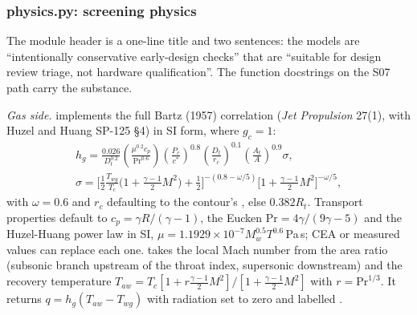 \subsubsection*{physics.py: screening physics}

The module header is a one-line title and two sentences: the models are ``intentionally conservative early-design checks'' that are ``suitable for design review triage, not hardware qualification''. The function docstrings on the S07 path carry the substance.

\emph{Gas side.}  implements the full Bartz (1957) correlation (\emph{Jet Propulsion} 27(1), with Huzel and Huang SP-125 \S4) in SI form, where $g_c = 1$:
\begin{gather*}
h_g = \frac{0.026}{D_t^{0.2}}\left(\frac{\mu^{0.2}c_p}{\mathrm{Pr}^{0.6}}\right)\left(\frac{P_c}{c^*}\right)^{0.8}\left(\frac{D_t}{r_c}\right)^{0.1}\left(\frac{A_t}{A}\right)^{0.9}\sigma,\\
\sigma = \Big[\tfrac12\tfrac{T_{wg}}{T_c}\big(1+\tfrac{\gamma-1}{2}M^2\big)+\tfrac12\Big]^{-(0.8-\omega/5)}\Big[1+\tfrac{\gamma-1}{2}M^2\Big]^{-\omega/5},
\end{gather*}
with $\omega = 0.6$ and $r_c$ defaulting to the contour's , else $0.382R_t$. Transport properties default to $c_p = \gamma R/(\gamma-1)$, the Eucken $\mathrm{Pr} = 4\gamma/(9\gamma-5)$ and the Huzel-Huang power law in SI, $\mu = 1.1929\times10^{-7}M_w^{0.5}T^{0.6}$\,Pa\,s; CEA or measured values can replace each one.  takes the local Mach number from the area ratio (subsonic branch upstream of the throat index, supersonic downstream) and the recovery temperature $T_{aw} = T_c[1 + r\tfrac{\gamma-1}{2}M^2]/[1+\tfrac{\gamma-1}{2}M^2]$ with $r = \mathrm{Pr}^{1/3}$. It returns $q = h_g(T_{aw}-T_{wg})$ with radiation set to zero and labelled .

